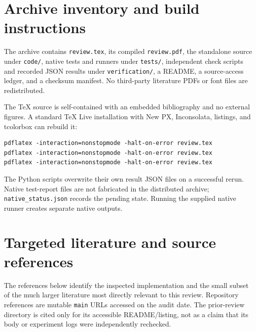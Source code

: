 \documentclass[11pt,letterpaper]{article}
\newcommand{\code}[1]{\texttt{#1}}
\theoremstyle{definition}
\begin{document}
\appendix
\section{Archive inventory and build instructions}

The archive contains \code{review.tex}, its compiled \code{review.pdf}, the standalone source under \code{code/}, native tests and runners under \code{tests/}, independent check scripts and recorded JSON results under \code{verification/}, a README, a source-access ledger, and a checksum manifest. No third-party literature PDFs or font files are redistributed.

The TeX source is self-contained with an embedded bibliography and no external figures. A standard TeX Live installation with New PX, Inconsolata, listings, and tcolorbox can rebuild it:
\begin{lstlisting}
pdflatex -interaction=nonstopmode -halt-on-error review.tex
pdflatex -interaction=nonstopmode -halt-on-error review.tex
pdflatex -interaction=nonstopmode -halt-on-error review.tex
\end{lstlisting}
The Python scripts overwrite their own result JSON files on a successful rerun. Native test-report files are not fabricated in the distributed archive; \code{native\_status.json} records the pending state. Running the supplied native runner creates separate native outputs.

\section{Targeted literature and source references}

The references below identify the inspected implementation and the small subset of the much larger literature most directly relevant to this review. Repository references are mutable \code{main} URLs accessed on the audit date. The prior-review directory is cited only for its accessible README/listing, not as a claim that its body or experiment logs were independently rechecked.
\end{document}
